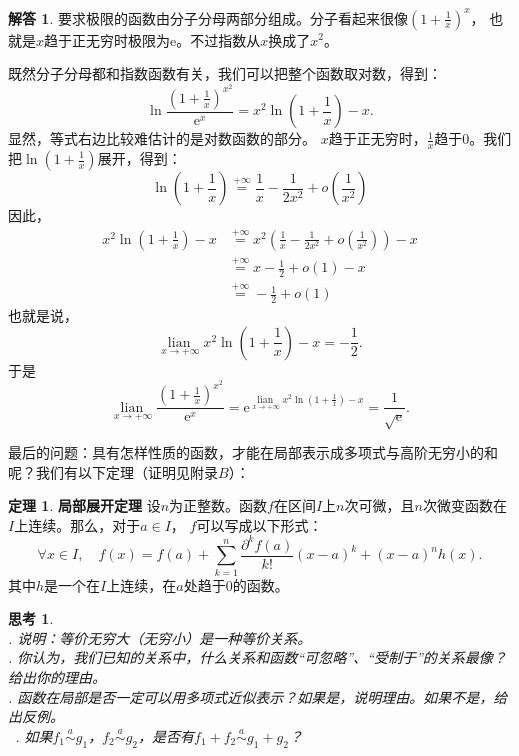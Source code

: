 \documentclass[12pt,UTF8]{ctexbook}
\newcommand{\lian}[1]{
    \underset{#1}{\operatorname{lian}\,}
}
\newcommand{\oveq}[1]{\overset{#1}{=}}
\newcommand{\olim}[1]{\mathit{o}\left(#1\right)}  %
\newcommand{\eqlim}[1]{\overset{#1}{\sim}}  %
\theoremstyle{definition}
\newtheorem{tm}{定理}[section]
\newtheorem*{so}{解答}
\theoremstyle{plain}
\newtheorem{sk}{思考}[section]
\begin{document}
\begin{so}
    要求极限的函数由分子分母两部分组成。分子看起来很像$\left(1 + \frac{1}{x}\right)^{x}$，
    也就是$x$趋于正无穷时极限为$\mathrm{e}$。不过指数从$x$换成了$x^2$。

    既然分子分母都和指数函数有关，我们可以把整个函数取对数，得到：
    $$ \ln{\frac{\left(1 + \frac{1}{x}\right)^{x^2}}{\mathrm{e}^x}} = x^2 \ln{\left(1 + \frac{1}{x}\right)} - x.$$
    显然，等式右边比较难估计的是对数函数的部分。
    $x$趋于正无穷时，$\frac{1}{x}$趋于$0$。我们把$\ln{\left(1 + \frac{1}{x}\right)}$展开，得到：
    $$ \ln{\left(1 + \frac{1}{x}\right)} \oveq{+\infty} \frac{1}{x} - \frac{1}{2x^2} + \olim{\frac{1}{x^2}}$$
    因此，
    \begin{align*}
        x^2 \ln{\left(1 + \frac{1}{x}\right)} - x &\oveq{+\infty} x^2 \left(\frac{1}{x} - \frac{1}{2x^2} + \olim{\frac{1}{x^2}}\right) - x  \\
        &\oveq{+\infty} x -\frac{1}{2} + \olim{1} - x  \\
        &\oveq{+\infty} -\frac{1}{2} + \olim{1} 
    \end{align*}
    也就是说，
    $$ \lian{x\to +\infty} x^2 \ln{\left(1 + \frac{1}{x}\right)} - x = -\frac{1}{2}. $$
    于是
    $$ \lian{x\to +\infty} \frac{\left(1 + \frac{1}{x}\right)^{x^2}}{\mathrm{e}^x} = \mathrm{e}^{\lian{x\to +\infty}  x^2 \ln{\left(1 + \frac{1}{x}\right)} - x} = \frac{1}{\sqrt{\mathrm{e}}}. $$
\end{so}

最后的问题：具有怎样性质的函数，才能在局部表示成多项式与高阶无穷小的和呢？我们有以下定理（证明见附录$B$）：
\begin{tm}{\textbf{局部展开定理}}
    设$n$为正整数。函数$f$在区间$I$上$n$次可微，且$n$次微变函数在$I$上连续。那么，对于$a\in I$，
    $f$可以写成以下形式：
    $$ \forall x \in I , \quad f(x) = f(a) + \sum_{k=1}^n \frac{\partial^k f (a)}{k!}(x - a)^k + (x - a)^n h(x). $$
    其中$h$是一个在$I$上连续，在$a$处趋于$0$的函数。
\end{tm}

\begin{sk}
    \mbox{} \\
    . 说明：等价无穷大（无穷小）是一种等价关系。\\
    . 你认为，我们已知的关系中，什么关系和函数“可忽略”、“受制于”的关系最像？给出你的理由。\\
    . 函数在局部是否一定可以用多项式近似表示？如果是，说明理由。如果不是，给出反例。\\\
    . 如果$f_1 \eqlim{a} g_1$，$f_2\eqlim{a} g_2$，是否有$f_1 + f_2\eqlim{a} g_1 + g_2$？
\end{sk}
\end{document}
